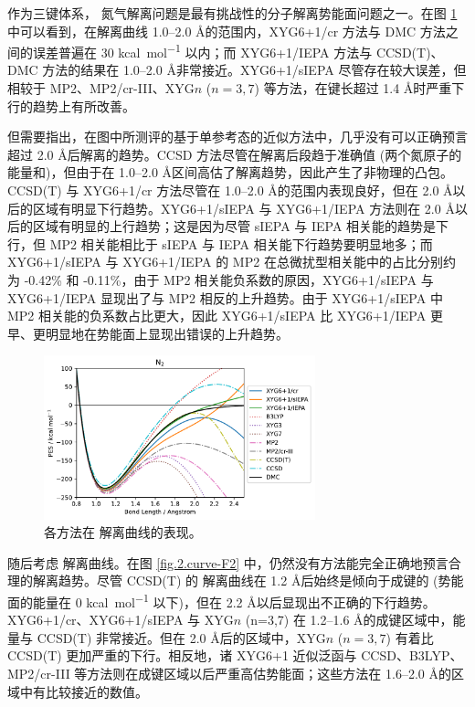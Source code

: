 作为三键体系， 氮气解离问题是最有挑战性的分子解离势能面问题之一。在图 \ref{fig.2.curve-N2} 中可以看到，在解离曲线 1.0--2.0 \AA 的范围内，XYG6+1/cr 方法与 DMC 方法之间的误差普遍在 30 \si{kcal.mol^{-1}} 以内；而 XYG6+1/IEPA 方法与 CCSD(T)、DMC 方法的结果在 1.0--2.0 \AA 非常接近。XYG6+1/sIEPA 尽管存在较大误差，但相较于 MP2、MP2/cr-III、XYG$n$ ($n=3,7$) 等方法，在键长超过 1.4 \AA 时严重下行的趋势上有所改善。

但需要指出，在图中所测评的基于单参考态的近似方法中，几乎没有可以正确预言超过 2.0 \AA 后解离的趋势。CCSD 方法尽管在解离后段趋于准确值 (两个氮原子的能量和)，但由于在 1.0--2.0 \AA 区间高估了解离趋势，因此产生了非物理的凸包。CCSD(T) 与 XYG6+1/cr 方法尽管在 1.0--2.0 \AA 的范围内表现良好，但在 2.0 \AA 以后的区域有明显下行趋势。XYG6+1/sIEPA 与 XYG6+1/IEPA 方法则在 2.0 \AA 以后的区域有明显的上行趋势；这是因为尽管 sIEPA 与 IEPA 相关能的趋势是下行，但 MP2 相关能相比于 sIEPA 与 IEPA 相关能下行趋势要明显地多；而 XYG6+1/sIEPA 与 XYG6+1/IEPA 的 MP2 在总微扰型相关能中的占比分别约为 -0.42\% 和 -0.11\%，由于 MP2 相关能负系数的原因，XYG6+1/sIEPA 与 XYG6+1/IEPA 显现出了与 MP2 相反的上升趋势。由于 XYG6+1/sIEPA 中 MP2 相关能的负系数占比更大，因此 XYG6+1/sIEPA 比 XYG6+1/IEPA 更早、更明显地在势能面上显现出错误的上升趋势。

\begin{figure}[h]
  \centering
  \includegraphics[width=0.7\textwidth]{assets/curve-N2.pdf}
  \caption{各方法在  解离曲线的表现。}
  \label{fig.2.curve-N2}
\end{figure}

随后考虑  解离曲线。在图 \ref{fig.2.curve-F2} 中，仍然没有方法能完全正确地预言合理的解离趋势。尽管 CCSD(T) 的  解离曲线在 1.2 \AA 后始终是倾向于成键的 (势能面的能量在 0 \si{kcal.mol^{-1}} 以下)，但在 2.2 \AA 以后显现出不正确的下行趋势。XYG6+1/cr、XYG6+1/sIEPA 与 XYG$n$ (n=3,7) 在 1.2--1.6 \AA 的成键区域中，能量与 CCSD(T) 非常接近。但在 2.0 \AA 后的区域中，XYG$n$ ($n=3,7$) 有着比 CCSD(T) 更加严重的下行。相反地，诸 XYG6+1 近似泛函与 CCSD、B3LYP、MP2/cr-III 等方法则在成键区域以后严重高估势能面；这些方法在 1.6--2.0 \AA 的区域中有比较接近的数值。

